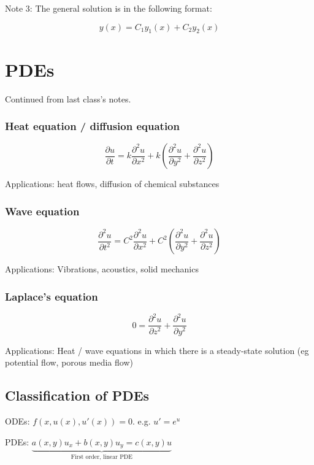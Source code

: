 \documentclass{article}
\begin{document}
Note 3: The general solution is in the following format:

$$y(x) = C_1 y_1(x) + C_2 y_2(x)$$

\hfill

\section{PDEs}

Continued from last class's notes. 

\subsubsection{Heat equation / diffusion equation}

$$\frac{\partial u}{\partial t} = k \frac{\partial^2 u}{\partial x^2} + k \left(\frac{\partial^2 u}{\partial y^2} + \frac{\partial^2 u}{\partial z^2} \right)$$

Applications: heat flows, diffusion of chemical substances

\subsubsection{Wave equation}

$$\frac{\partial^2 u}{\partial t^2} = C^2 \frac{\partial^2 u}{\partial x^2} + C^2 \left(\frac{\partial^2 u}{\partial y^2} + \frac{\partial^2 u}{\partial z^2}\right)$$

Applications: Vibrations, acoustics, solid mechanics

\subsubsection{Laplace's equation}

$$0 = \frac{\partial^2 u}{\partial z^2} + \frac{\partial^2 u}{\partial y^2}$$

Applications: Heat / wave equations in which there is a steady-state solution (eg potential flow, porous media flow)

\subsection{Classification of PDEs}

\hfill

ODEs: $f(x,u(x), u'(x)) = 0$. e.g. $u' = e^u$

\hfill

PDEs: $\underbrace{a(x,y) u_x + b(x,y) u_y = c(x,y) u}_{\text{First order, linear PDE}}$
\end{document}
